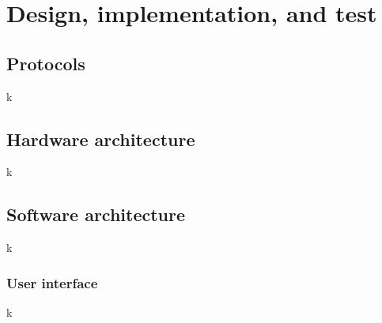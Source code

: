\chapter{Design, implementation, and test}

\section{Protocols}
k

\section{Hardware architecture}
k

\section{Software architecture}
k

\subsection{User interface}
k